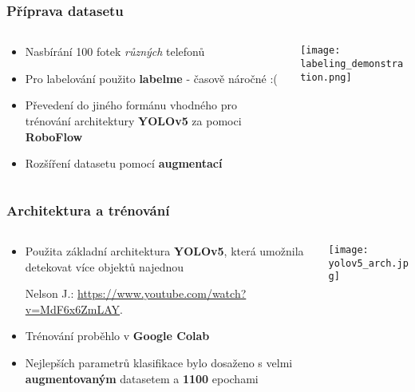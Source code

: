 \begin{frame}
   \frametitle{Příprava datasetu}
   \begin{columns}[t, onlytextwidth]
      \begin{column}[T]{0.5\textwidth}
         \begin{itemize}
            \item Nasbírání 100 fotek \emph{různých} telefonů
            \item Pro labelování použito \textbf{labelme} - časově náročné :(
            \item Převedení do jiného formánu vhodného pro trénování architektury \textbf{YOLOv5} za pomoci \textbf{RoboFlow}
            \item Rozšíření datasetu pomocí \textbf{augmentací}
         \end{itemize}
      \end{column}
      \begin{column}[T]{0.49\textwidth}
         \centering
         \texttt{[image: labeling\_demonstration.png]}
      \end{column}
   \end{columns}
\end{frame}

\begin{frame}
   \frametitle{Architektura a trénování}
   \begin{columns}[t, onlytextwidth]
      \begin{column}[T]{0.44\textwidth}
         \begin{itemize}
            \item Použita základní architektura \textbf{YOLOv5}, která umožnila detekovat více objektů najednou
            \parbox{\textwidth}{\tiny {\color{ctu4blue}Nelson J.}: \url{https://www.youtube.com/watch?v=MdF6x6ZmLAY}.}
            \item Trénování proběhlo v \textbf{Google Colab}
            \item Nejlepších parametrů klasifikace bylo dosaženo s velmi \textbf{augmentovaným} datasetem a \textbf{1100} epochami
         \end{itemize}
      \end{column}
      \begin{column}[T]{0.55\textwidth}
         \centering
         \texttt{[image: yolov5\_arch.jpg]}
      \end{column}
   \end{columns}
\end{frame}